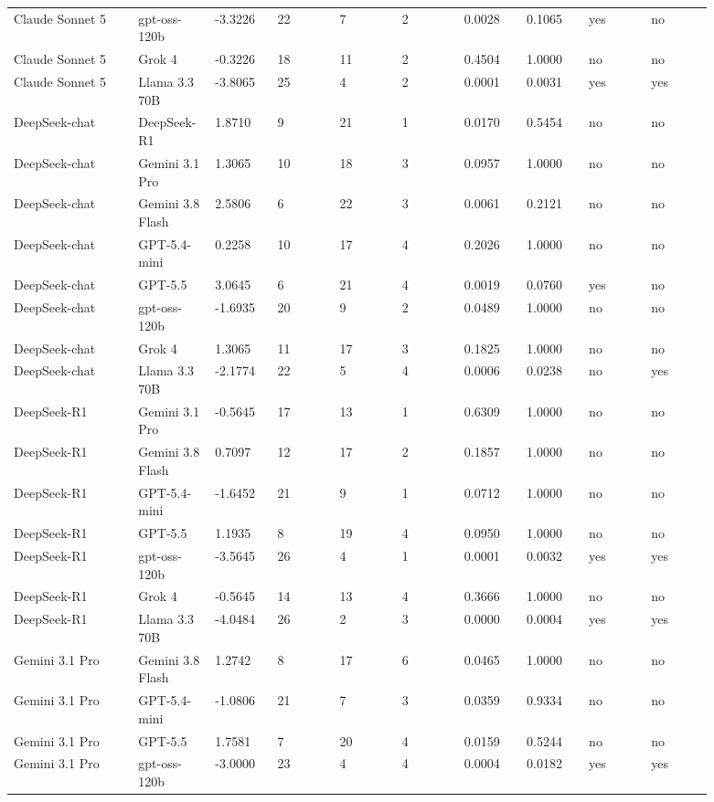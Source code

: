 \begin{landscape}
\begin{longtable}{p{0.162\linewidth}p{0.081\linewidth}p{0.081\linewidth}p{0.081\linewidth}p{0.081\linewidth}p{0.081\linewidth}p{0.081\linewidth}p{0.081\linewidth}p{0.081\linewidth}p{0.081\linewidth}}
Claude Sonnet 5 & gpt-oss-120b & -3.3226 & 22 & 7 & 2 & 0.0028 & 0.1065 & yes & no \\
Claude Sonnet 5 & Grok 4 & -0.3226 & 18 & 11 & 2 & 0.4504 & 1.0000 & no & no \\
Claude Sonnet 5 & Llama 3.3 70B & -3.8065 & 25 & 4 & 2 & 0.0001 & 0.0031 & yes & yes \\
DeepSeek-chat & DeepSeek-R1 & 1.8710 & 9 & 21 & 1 & 0.0170 & 0.5454 & no & no \\
DeepSeek-chat & Gemini 3.1 Pro & 1.3065 & 10 & 18 & 3 & 0.0957 & 1.0000 & no & no \\
DeepSeek-chat & Gemini 3.8 Flash & 2.5806 & 6 & 22 & 3 & 0.0061 & 0.2121 & no & no \\
DeepSeek-chat & GPT-5.4-mini & 0.2258 & 10 & 17 & 4 & 0.2026 & 1.0000 & no & no \\
DeepSeek-chat & GPT-5.5 & 3.0645 & 6 & 21 & 4 & 0.0019 & 0.0760 & yes & no \\
DeepSeek-chat & gpt-oss-120b & -1.6935 & 20 & 9 & 2 & 0.0489 & 1.0000 & no & no \\
DeepSeek-chat & Grok 4 & 1.3065 & 11 & 17 & 3 & 0.1825 & 1.0000 & no & no \\
DeepSeek-chat & Llama 3.3 70B & -2.1774 & 22 & 5 & 4 & 0.0006 & 0.0238 & no & yes \\
DeepSeek-R1 & Gemini 3.1 Pro & -0.5645 & 17 & 13 & 1 & 0.6309 & 1.0000 & no & no \\
DeepSeek-R1 & Gemini 3.8 Flash & 0.7097 & 12 & 17 & 2 & 0.1857 & 1.0000 & no & no \\
DeepSeek-R1 & GPT-5.4-mini & -1.6452 & 21 & 9 & 1 & 0.0712 & 1.0000 & no & no \\
DeepSeek-R1 & GPT-5.5 & 1.1935 & 8 & 19 & 4 & 0.0950 & 1.0000 & no & no \\
DeepSeek-R1 & gpt-oss-120b & -3.5645 & 26 & 4 & 1 & 0.0001 & 0.0032 & yes & yes \\
DeepSeek-R1 & Grok 4 & -0.5645 & 14 & 13 & 4 & 0.3666 & 1.0000 & no & no \\
DeepSeek-R1 & Llama 3.3 70B & -4.0484 & 26 & 2 & 3 & 0.0000 & 0.0004 & yes & yes \\
Gemini 3.1 Pro & Gemini 3.8 Flash & 1.2742 & 8 & 17 & 6 & 0.0465 & 1.0000 & no & no \\
Gemini 3.1 Pro & GPT-5.4-mini & -1.0806 & 21 & 7 & 3 & 0.0359 & 0.9334 & no & no \\
Gemini 3.1 Pro & GPT-5.5 & 1.7581 & 7 & 20 & 4 & 0.0159 & 0.5244 & no & no \\
Gemini 3.1 Pro & gpt-oss-120b & -3.0000 & 23 & 4 & 4 & 0.0004 & 0.0182 & yes & yes \\

\end{longtable}
\end{landscape}
